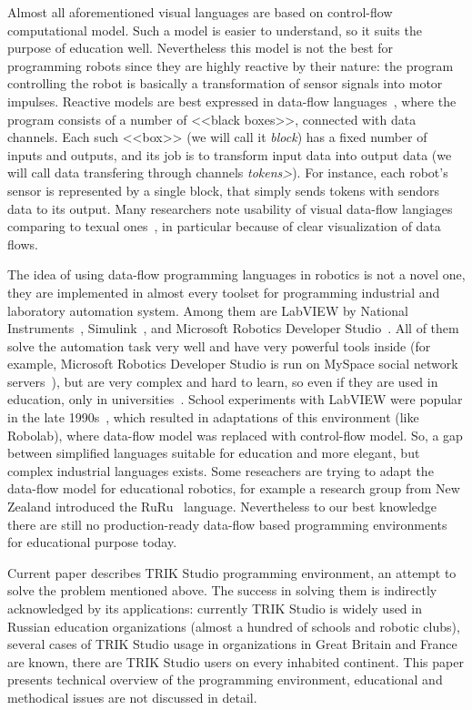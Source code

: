 \documentclass[conference]{IEEEtran}
\begin{document}
Almost all aforementioned visual languages are based on control-flow computational model. Such a model is easier to understand, so it suits the purpose of education well. Nevertheless this model is not the best for programming robots since they are highly reactive by their nature: the program controlling the robot is basically a transformation of sensor signals into motor impulses. Reactive models are best expressed in data-flow languages~\cite{johnston2004advances}, where the program consists of a number of <<black boxes>>, connected with data channels. Each such <<box>> (we will call it \textit{block}) has a fixed number of inputs and outputs, and its job is to transform input data into output data (we will call data transfering through channels \textit{tokens>}). For instance, each robot's sensor is represented by a single block, that simply sends tokens with sendors data to its output. Many researchers  note usability of visual data-flow langiages comparing to texual ones~\cite{johnston2004advances}, in particular because of clear visualization of data flows.

The idea of using data-flow programming languages in robotics is not a novel one, they are implemented in almost every toolset for programming industrial and laboratory automation system. Among them are LabVIEW by National Instruments~\cite{kodosky1991visual}, Simulink~\cite{dabney2004mastering}, and Microsoft Robotics Developer Studio~\cite{jackson2007microsoft}. All of them solve the automation task very well and have very powerful tools inside (for example, Microsoft Robotics Developer Studio is run on MySpace social network servers~\cite{scherotter2009ccr}), but are very complex and hard to learn, so even if they are used in education, only in universities~\cite{stefanovic2011labview,yi2005labview}. School experiments with LabVIEW were popular in the late 1990s~\cite{cyr1997low,portsmore1999robolab}, which resulted in adaptations of this environment (like Robolab), where data-flow model was replaced with control-flow model. So, a gap between simplified languages suitable for education and more elegant, but complex industrial languages exists. Some reseachers are trying to adapt the data-flow model for educational robotics, for example a research group from New Zealand introduced the RuRu~\cite{diprose2011ruru} language. Nevertheless to our best knowledge there are still no production-ready data-flow based programming environments for educational purpose today.

Current paper describes TRIK Studio programming environment, an attempt to solve the problem	 mentioned above. The success in solving them is indirectly acknowledged by its applications: currently TRIK Studio is widely used in Russian education organizations (almost a hundred of schools and robotic clubs), several cases of TRIK Studio usage in organizations in Great Britain and France are known, there are TRIK Studio users on every inhabited continent. This paper presents technical overview of the programming environment, educational and methodical issues are not discussed in detail.
\end{document}
